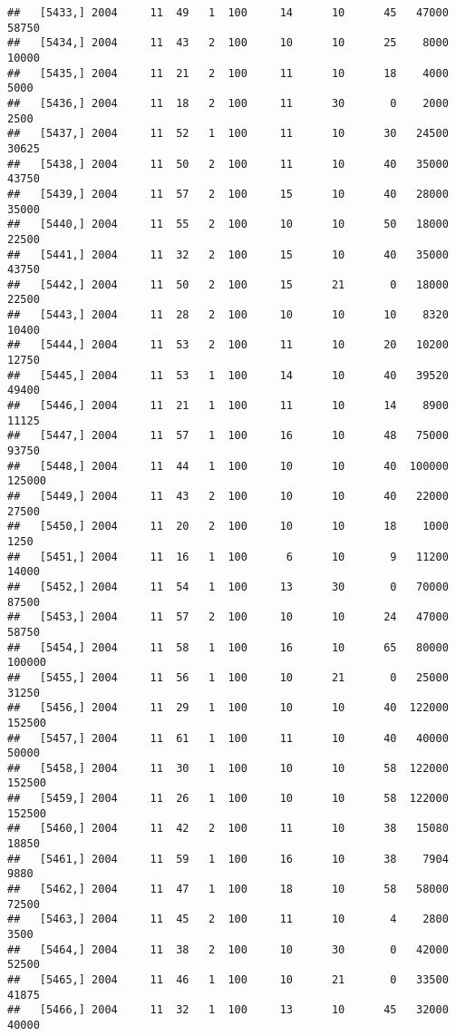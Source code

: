\documentclass{article}\usepackage[]{graphicx}\usepackage[]{color}
\makeatletter
\newenvironment{kframe}{%
 \def\at@end@of@kframe{}%
 \ifinner\ifhmode%
  \def\at@end@of@kframe{\end{minipage}}%
  \begin{minipage}{\columnwidth}%
 \fi\fi%
 \def\FrameCommand##1{\hskip\@totalleftmargin \hskip-\fboxsep
 \colorbox{shadecolor}{##1}\hskip-\fboxsep
     \hskip-\linewidth \hskip-\@totalleftmargin \hskip\columnwidth}%
 \MakeFramed {\advance\hsize-\width
   \@totalleftmargin\z@ \linewidth\hsize
   \@setminipage}}%
 {\par\unskip\endMakeFramed%
 \at@end@of@kframe}
\newenvironment{knitrout}{}{} %
\makeatother
\begin{document}
\begin{knitrout}
\begin{kframe}
\begin{verbatim}
##   [5433,] 2004     11  49   1  100     14      10      45   47000   58750
##   [5434,] 2004     11  43   2  100     10      10      25    8000   10000
##   [5435,] 2004     11  21   2  100     11      10      18    4000    5000
##   [5436,] 2004     11  18   2  100     11      30       0    2000    2500
##   [5437,] 2004     11  52   1  100     11      10      30   24500   30625
##   [5438,] 2004     11  50   2  100     11      10      40   35000   43750
##   [5439,] 2004     11  57   2  100     15      10      40   28000   35000
##   [5440,] 2004     11  55   2  100     10      10      50   18000   22500
##   [5441,] 2004     11  32   2  100     15      10      40   35000   43750
##   [5442,] 2004     11  50   2  100     15      21       0   18000   22500
##   [5443,] 2004     11  28   2  100     10      10      10    8320   10400
##   [5444,] 2004     11  53   2  100     11      10      20   10200   12750
##   [5445,] 2004     11  53   1  100     14      10      40   39520   49400
##   [5446,] 2004     11  21   1  100     11      10      14    8900   11125
##   [5447,] 2004     11  57   1  100     16      10      48   75000   93750
##   [5448,] 2004     11  44   1  100     10      10      40  100000  125000
##   [5449,] 2004     11  43   2  100     10      10      40   22000   27500
##   [5450,] 2004     11  20   2  100     10      10      18    1000    1250
##   [5451,] 2004     11  16   1  100      6      10       9   11200   14000
##   [5452,] 2004     11  54   1  100     13      30       0   70000   87500
##   [5453,] 2004     11  57   2  100     10      10      24   47000   58750
##   [5454,] 2004     11  58   1  100     16      10      65   80000  100000
##   [5455,] 2004     11  56   1  100     10      21       0   25000   31250
##   [5456,] 2004     11  29   1  100     10      10      40  122000  152500
##   [5457,] 2004     11  61   1  100     11      10      40   40000   50000
##   [5458,] 2004     11  30   1  100     10      10      58  122000  152500
##   [5459,] 2004     11  26   1  100     10      10      58  122000  152500
##   [5460,] 2004     11  42   2  100     11      10      38   15080   18850
##   [5461,] 2004     11  59   1  100     16      10      38    7904    9880
##   [5462,] 2004     11  47   1  100     18      10      58   58000   72500
##   [5463,] 2004     11  45   2  100     11      10       4    2800    3500
##   [5464,] 2004     11  38   2  100     10      30       0   42000   52500
##   [5465,] 2004     11  46   1  100     10      21       0   33500   41875
##   [5466,] 2004     11  32   1  100     13      10      45   32000   40000

\end{verbatim}
\end{kframe}
\end{knitrout}
\end{document}
